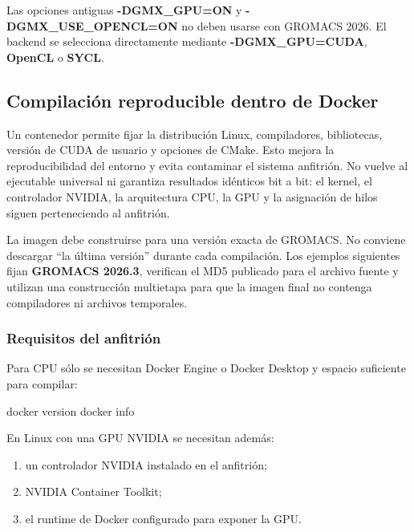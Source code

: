 \documentclass[
  spanish,
  11pt,
  a4paper]{article}
\newenvironment{Shaded}{\begin{snugshade}}{\end{snugshade}}
\newcommand{\ExtensionTok}[1]{#1}
\newcommand{\NormalTok}[1]{#1}
\providecommand{\tightlist}{%
  \setlength{\itemsep}{0pt}\setlength{\parskip}{0pt}}
\begin{document}
Las opciones antiguas \textbf{-DGMX\_GPU=ON} y
\textbf{-DGMX\_USE\_OPENCL=ON} no deben usarse con GROMACS 2026. El
backend se selecciona directamente mediante \textbf{-DGMX\_GPU=CUDA},
\textbf{OpenCL} o \textbf{SYCL}.

\subsection{Compilación reproducible dentro de
Docker}\label{compilaciuxf3n-reproducible-dentro-de-docker}

Un contenedor permite fijar la distribución Linux, compiladores,
bibliotecas, versión de CUDA de usuario y opciones de CMake. Esto mejora
la reproducibilidad del entorno y evita contaminar el sistema anfitrión.
No vuelve al ejecutable universal ni garantiza resultados idénticos bit
a bit: el kernel, el controlador NVIDIA, la arquitectura CPU, la GPU y
la asignación de hilos siguen perteneciendo al anfitrión.

La imagen debe construirse para una versión exacta de GROMACS. No
conviene descargar ``la última versión'' durante cada compilación. Los
ejemplos siguientes fijan \textbf{GROMACS 2026.3}, verifican el MD5
publicado para el archivo fuente y utilizan una construcción multietapa
para que la imagen final no contenga compiladores ni archivos
temporales.

\subsubsection{Requisitos del
anfitrión}\label{requisitos-del-anfitriuxf3n}

Para CPU sólo se necesitan Docker Engine o Docker Desktop y espacio
suficiente para compilar:

\begin{Shaded}
\begin{Highlighting}[]
\ExtensionTok{docker}\NormalTok{ version}
\ExtensionTok{docker}\NormalTok{ info}
\end{Highlighting}
\end{Shaded}

En Linux con una GPU NVIDIA se necesitan además:

\begin{enumerate}
\def\labelenumi{\arabic{enumi}.}
\tightlist
\item
  un controlador NVIDIA instalado en el anfitrión;
\item
  NVIDIA Container Toolkit;
\item
  el runtime de Docker configurado para exponer la GPU.
\end{enumerate}
\end{document}
